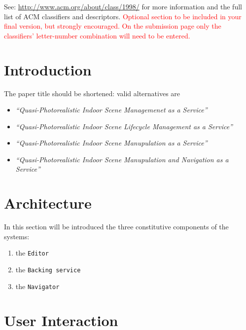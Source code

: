 \documentclass{sigchi}
\begin{document}

See: \url{http://www.acm.org/about/class/1998/}
for more information and the full list of ACM classifiers
and descriptors. \newline
\textcolor{red}{Optional section to be included in your final version,
but strongly encouraged. On the submission page only the classifiers’
letter-number combination will need to be entered.}

\section{Introduction}  %
\label{sec:introduction}
The paper title should be shortened: valid alternatives are

\begin{itemize}
   \item \emph{``Quasi-Photorealistic Indoor Scene Managemenet as a Service''}
   \item \emph{``Quasi-Photorealistic Indoor Scene Lifecycle Management as a Service''}
   \item \emph{``Quasi-Photorealistic Indoor Scene Manupulation as a Service''}
   \item \emph{``Quasi-Photorealistic Indoor Scene Manupulation and Navigation as a Service''}
 \end{itemize} 


\section{Architecture} %
\label{sec:architecture}

In this section will be introduced the three constitutive components of the systems:

\begin{enumerate}
  \item the {\tt Editor}
  \item the {\tt Backing service}
  \item the {\tt Navigator}
\end{enumerate}



\section{User Interaction} %
\label{sec:user_interaction}
\end{document}
